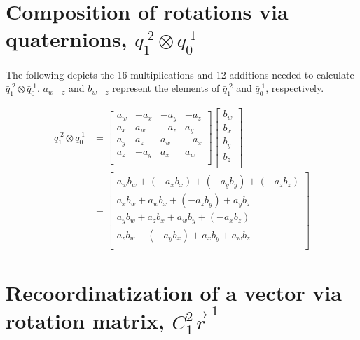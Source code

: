 \begin{parts}
    \part{Composition of rotations via quaternions, $\bar{q}_1^{\;2} \otimes \bar{q}_0^{\;1}$}

    \solution
    The following depicts the 16 multiplications and 12 additions needed to calculate $\bar{q}_1^{\;2} \otimes \bar{q}_0^{\;1}$. $a_{w-z}$ and $b_{w-z}$ represent the elements of $\bar{q}_1^{\;2}$ and $\bar{q}_0^{\;1}$, respectively.

    \begin{equation*}
        \begin{split}
            \bar{q}_1^{\;2} \otimes \bar{q}_0^{\;1} & =
            \begin{bmatrix}
                a_w & - a_x & - a_y & -a_z  \\
                a_x & a_w   & - a_z & a_y   \\
                a_y & a_z   & a_w   & - a_x \\
                a_z & -a_y  & a_x   & a_w   \\
            \end{bmatrix}
            \begin{bmatrix}
                b_w \\
                b_x \\
                b_y \\
                b_z \\
            \end{bmatrix} \\
            & =
            \begin{bmatrix}
                a_wb_w + (-a_xb_x) + (-a_yb_y) + (-a_zb_z) \\
                a_xb_w + a_wb_x + (-a_zb_y) + a_yb_z       \\
                a_yb_w + a_zb_x + a_wb_y + (-a_xb_z)       \\
                a_zb_w + (-a_yb_x) + a_xb_y + a_wb_z       \\
            \end{bmatrix}
        \end{split}
    \end{equation*}


    \part{Recoordinatization of a vector via rotation matrix, $C_1^2\vec{r}^{\;1}$}


\end{parts}

